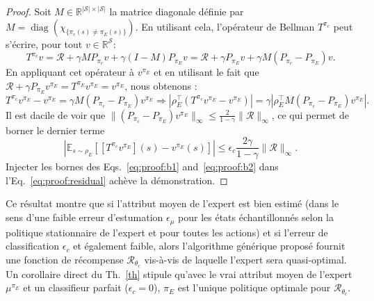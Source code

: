 \documentclass[english,utf8]{./hermes-journal}
\newcommand{\diag}{\operatorname*{diag}}
\newcommand{\R}{\mathcal{R}}
\newcommand{\s}{\mathcal{S}}
\newcommand{\E}{\mathbb{E}}
\begin{document}
\begin{proof}
   Soit $M\in\mathbb{R}^{|\s|\times |\s|}$ la matrice diagonale définie par $M = \diag (\chi_{\{\pi_c(s)\neq\pi_E(s)\}})$. En utilisant cela, l'opérateur de Bellman $T^{\pi_c}$ peut s'écrire, pour tout $v\in\mathbb{R}^\s$:
  \begin{equation}
    T^{\pi_c}v = \R + \gamma M P_{\pi_c} v + \gamma (I-M)P_{\pi_E} v
    = \R + \gamma P_{\pi_E} v + \gamma M (P_{\pi_c}-P_{\pi_E})v.
  \end{equation}
  En appliquant cet opérateur à  $v^{\pi_E}$ et en utilisant le fait que $\R +
  \gamma P_{\pi_E} v^{\pi_E} = T^{\pi_E} v^{\pi_E} = v^{\pi_E}$, nous obtenons :
  \begin{equation}
    T^{\pi_c}v^{\pi_E} - v^{\pi_E} = \gamma M
    (P_{\pi_c}-P_{\pi_E})v^{\pi_E}
    \Rightarrow |\rho_E^\top (T^{\pi_c}v^{\pi_E} - v^{\pi_E})| = \gamma
    |\rho_E^\top M (P_{\pi_c}-P_{\pi_E})v^{\pi_E}|.
  \end{equation}
  Il est dacile de voir que $\|(P_{\pi_c}-P_{\pi_E})v^{\pi_E}\|_\infty
  \leq \frac{2}{1-\gamma}\|\R\|_\infty$, ce qui permet de borner le dernier terme
  \begin{equation}
    |\E_{s\sim\rho_E}[[T^{\pi_c}v^{\pi_E}](s) - v^{\pi_E}(s)]| \leq
    \epsilon_c \frac{2\gamma}{1-\gamma} \|\R\|_\infty.
    \label{eq:proof:b2}
  \end{equation}
  Injecter les bornes des Eqs.~\eqref{eq:proof:b1}
  and~\eqref{eq:proof:b2} dans l'Eq.~\eqref{eq:proof:residual} achève la démonstration.%
\end{proof}

Ce résultat montre que si l'attribut moyen de l'expert est bien estimé (dans le sens d'une faible erreur d'estumation $\epsilon_\mu$ pour les états échantillonnés selon la politique stationnaire de l'expert et pour toutes les actions) et si l'erreur de classification $\epsilon_c$ et également faible, alors l'algorithme générique proposé fournit une fonction de récompense 
$\R_{\theta_c}$ vis-à-vis de laquelle l'expert sera quasi-optimal. Un corollaire direct du Th.~\ref{th} stipule qu'avec le vrai attribut moyen de l'expert $\mu^{\pi_E}$ et un classifieur parfait 
($\epsilon_c=0$), $\pi_E$ est l'unique politique optimale pour 
$\R_{\theta_c}$.
\end{document}
